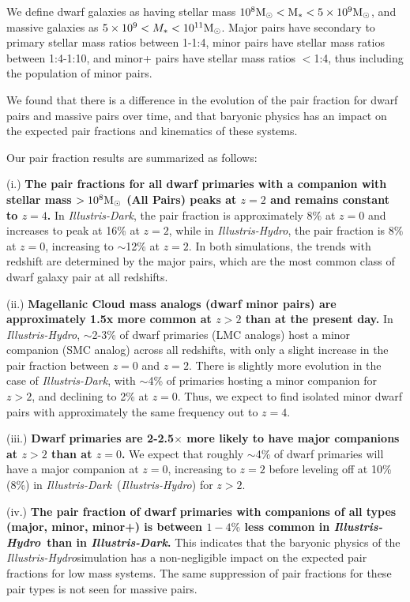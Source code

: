 \documentclass[twocolumn]{aastex63}
\newcommand\msun{\rm{M}_{\odot}}
\newcommand\ID{\textit{Illustris-Dark}}
\newcommand\IH{\textit{Illustris-Hydro}}
\begin{document}
We define dwarf galaxies as having stellar mass $10^8\msun <M_* < 5\times10^9 \msun$, and massive galaxies as $5\times10^9<M_*<10^{11}\msun$. Major pairs have secondary to primary stellar mass ratios between 1-1:4, minor pairs have stellar mass ratios between 1:4-1:10, and minor+ pairs have stellar mass ratios $<$1:4, thus including the population of minor pairs. 

We found that there is a difference in the evolution of the pair fraction for dwarf pairs and massive pairs over time, and that baryonic physics has an impact on the expected pair fractions and kinematics of these systems. 


Our pair fraction results are summarized as follows:

(i.) \textbf{The pair fractions for all dwarf primaries with a companion with stellar mass $>10^8\msun$ (All Pairs) peaks at $z=2$ and remains constant to $z=4$.} In \ID, the pair fraction is approximately $8\%$ at $z=0$ and increases to peak at 16\% at $z=2$, while in \IH, the pair fraction is $8\%$ at $z=0$, increasing to $\sim$12\% at $z=2$. In both simulations, the trends with redshift are determined by the major pairs, which are the most common class of dwarf galaxy pair at all redshifts. 

(ii.) \textbf{Magellanic Cloud mass analogs (dwarf minor pairs) are approximately 1.5x more common at $z>2$ than at the present day.} In \IH, $\sim$2-3\% of dwarf primaries (LMC analogs) host a minor companion (SMC analog) across all redshifts, with only a slight increase in the pair fraction between $z=0$ and $z=2$. There is slightly more evolution in the case of \ID, with $\sim$4\% of primaries hosting a minor companion for $z>2$, and declining to 2\% at $z=0$. Thus, we expect to find isolated minor dwarf pairs with approximately the same frequency out to $z=4$.

(iii.) \textbf{Dwarf primaries are 2-2.5$\times$ more likely to have major companions at $z>2$ than at $z=0$.} We expect that roughly $\sim$4\% of dwarf primaries will have a major companion at $z=0$, increasing to $z=2$ before leveling off at 10\% (8\%) in \ID\ (\IH) for $z>2$.

(iv.) \textbf{The pair fraction of dwarf primaries with companions of all types (major, minor, minor+) is between $1-4\%$ less common in \IH\ than in \ID.} This indicates that the baryonic physics of the \IH simulation has a non-negligible impact on the expected pair fractions for low mass systems. The same suppression of pair fractions for these pair types is not seen for massive pairs.
\end{document}
